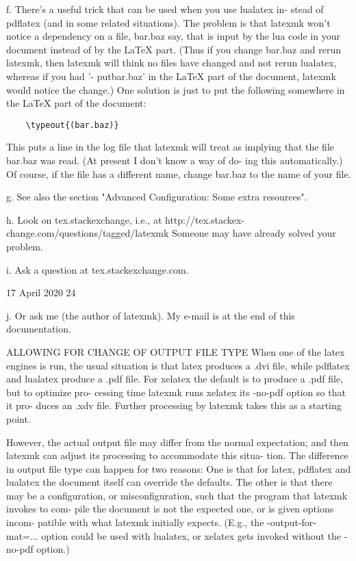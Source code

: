 f. There's a useful trick that can be used when you  use  lualatex  in-
stead  of  pdflatex  (and  in some related situations).  The problem is
that latexmk won't notice a dependency on a file, bar.baz say, that  is
input  by  the  lua code in your document instead of by the LaTeX part.
(Thus if you change bar.baz and rerun latexmk, then latexmk will  think
no  files have changed and not rerun lualatex, whereas if you had '\in-
put{bar.baz}' in the LaTeX part of the document, latexmk  would  notice
the  change.)   One  solution is just to put the following somewhere in
the LaTeX part of the document:

\begin{verbatim}
	\typeout{(bar.baz)}
\end{verbatim}

       This puts a line in the log file that latexmk will  treat  as  implying
       that  the file bar.baz was read.  (At present I don't know a way of do-
       ing this automatically.)  Of course, if the file has a different  name,
       change bar.baz to the name of your file.

       g. See also the section "Advanced Configuration: Some extra resources".

       h.    Look   on   tex.stackexchange,   i.e.,   at   http://tex.stackex-
       change.com/questions/tagged/latexmk  Someone may  have  already  solved
       your problem.

       i. Ask a question at tex.stackexchange.com.



                                 17 April 2020                              24








       j.  Or ask me (the author of latexmk).  My e-mail is at the end of this
       documentation.



ALLOWING FOR CHANGE OF OUTPUT FILE TYPE
       When one of the latex engines is run, the usual situation is that latex
       produces  a .dvi file, while pdflatex and lualatex produce a .pdf file.
       For xelatex the default is to produce a .pdf file, but to optimize pro-
       cessing  time  latexmk  runs xelatex its -no-pdf option so that it pro-
       duces an .xdv file.  Further processing by  latexmk  takes  this  as  a
       starting point.

       However, the actual output file may differ from the normal expectation;
       and then latexmk can adjust its processing to accommodate  this  situa-
       tion.   The  difference in output file type can happen for two reasons:
       One is that for latex, pdflatex and lualatex the  document  itself  can
       override  the defaults. The other is that there may be a configuration,
       or misconfiguration, such that the program that latexmk invokes to com-
       pile  the  document is not the expected one, or is given options incom-
       patible with what latexmk initially expects.  (E.g.,  the  -output-for-
       mat=...   option  could  be used with lualatex, or xelatex gets invoked
       without the -no-pdf option.)

